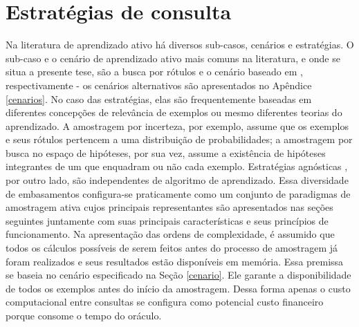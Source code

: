 \section{Estratégias de consulta}\label{estrategias}
Na literatura de aprendizado ativo há diversos sub-casos, cenários e estratégias.
O sub-caso e o cenário de aprendizado ativo mais comuns na literatura,
e onde se situa a presente tese, são a busca por rótulos e
o cenário baseado em \pool, respectivamente - os
cenários alternativos são apresentados no Apêndice \ref{cenarios}.
No caso das estratégias,
elas são frequentemente baseadas em diferentes concepções de relevância de
exemplos ou mesmo diferentes teorias do aprendizado.
A amostragem por incerteza,
por exemplo, assume que os exemplos e seus rótulos pertencem a uma
distribuição de probabilidades;
a amostragem por busca no espaço de hipóteses, por sua vez, assume a existência
de hipóteses integrantes de um  \citep{books/daglib/0087929}
que enquadram ou não cada exemplo.
Estratégias agnósticas \citep{journals/jcss/BalcanBL09}, por outro lado,
são independentes de algoritmo de aprendizado.
Essa diversidade de embasamentos configura-se praticamente como um conjunto de paradigmas
de amostragem ativa cujos principais representantes são apresentados nas
seções seguintes juntamente com suas principais características e seus princípios de funcionamento.
Na apresentação das ordens de complexidade, é assumido que todos os cálculos
possíveis de serem feitos antes do processo de amostragem já foram realizados
e seus resultados estão disponíveis em memória.
Essa premissa se baseia no cenário especificado na Seção \ref{cenario}.
Ele garante a disponibilidade de todos os exemplos antes do início da amostragem.
Dessa forma apenas o custo computacional entre consultas se configura como potencial
custo financeiro porque consome o tempo do oráculo.






